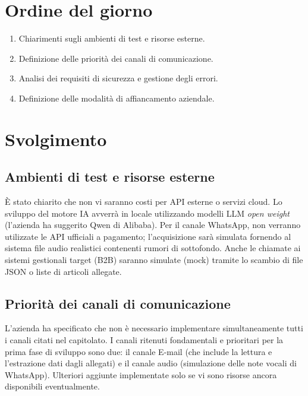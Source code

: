 \documentclass[verbale=esterno]{gpt}
\begin{document}
\section{Ordine del giorno}
\begin{enumerate}
    \item Chiarimenti sugli ambienti di test e risorse esterne.
    \item Definizione delle priorità dei canali di comunicazione.
    \item Analisi dei requisiti di sicurezza e gestione degli errori.
    \item Definizione delle modalità di affiancamento aziendale.
\end{enumerate}

\section{Svolgimento}
\subsection{Ambienti di test e risorse esterne}
È stato chiarito che non vi saranno costi per API esterne o servizi cloud. Lo sviluppo del motore IA avverrà in locale utilizzando modelli LLM \textit{open weight} (l'azienda ha suggerito Qwen di Alibaba). Per il canale WhatsApp, non verranno utilizzate le API ufficiali a pagamento; l'acquisizione sarà simulata fornendo al sistema file audio realistici contenenti rumori di sottofondo. Anche le chiamate ai sistemi gestionali target (B2B) saranno simulate (mock) tramite lo scambio di file JSON o liste di articoli allegate.

\subsection{Priorità dei canali di comunicazione}
L'azienda ha specificato che non è necessario implementare simultaneamente tutti i canali citati nel capitolato. I canali ritenuti fondamentali e prioritari per la prima fase di sviluppo sono due: il canale E-mail (che include la lettura e l'estrazione dati dagli allegati) e il canale audio (simulazione delle note vocali di WhatsApp). Ulteriori aggiunte implementate solo se vi sono risorse ancora disponibili eventualmente.
\end{document}
